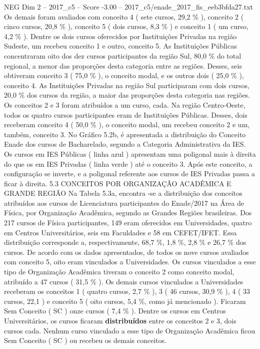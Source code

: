 \begin{textsample}{NEG Dim 2 – 2017\_c5 – Score -3.00 – 2017\_c5/enade\_2017\_fis\_eeb3bfda27.txt}
Os demais foram avaliados com conceito 4 ( sete cursos, 29,2 \% ), conceito 2 ( cinco cursos, 20,8 \% ), conceito 5 ( dois cursos, 8,3 \% ) e conceito 1 ( um curso, 4,2 \% ).
Dentre os dois cursos oferecidos por Instituições Privadas na região Sudeste, um recebeu conceito 1 e outro, conceito 5.
As Instituições Públicas concentraram oito dos dez cursos participantes da região Sul, 80,0 \% do total regional, a menor das proporções desta categoria entre as regiões.
Desses, seis obtiveram conceito 3 ( 75,0 \% ), o conceito modal, e os outros dois ( 25,0 \% ), conceito 4.
As Instituições Privadas na região Sul participaram com dois cursos, 20,0 \% dos cursos da região, a maior das proporções desta categoria nas regiões.
Os conceitos 2 e 3 foram atribuídos a um curso, cada.
Na região Centro-Oeste, todos os quatro cursos participantes eram de Instituições Públicas.
Desses, dois receberam conceito 4 ( 50,0 \% ), o conceito modal, um recebeu conceito 2 e um, também, conceito 3.
No Gráfico 5.2b, é apresentada a distribuição do Conceito Enade dos cursos de Bacharelado, segundo a Categoria Administrativa da IES.
Os cursos em IES Públicas ( linha azul ) apresentam uma poligonal mais à direita do que os em IES Privadas ( linha verde ) até o conceito 3.
Após este conceito, a configuração se inverte, e a poligonal referente aos cursos de IES Privadas passa a ficar à direita. 5.3 CONCEITOS POR ORGANIZAÇÃO ACADÊMICA E GRANDE REGIÃO Na Tabela 5.3a, encontra -se a distribuição dos conceitos atribuídos aos cursos de Licenciatura participantes do Enade/2017 na Área de Física, por Organização Acadêmica, segundo as Grandes Regiões brasileiras.
Dos 217 cursos de Física participantes, 149 eram oferecidos em Universidades, quatro em Centros Universitários, seis em Faculdades e 58 em CEFET/IFET.
Essa distribuição corresponde a, respectivamente, 68,7 \%, 1,8 \%, 2,8 \% e 26,7 \% dos cursos.
De acordo com os dados apresentados, de todos os nove cursos avaliados com conceito 5, oito eram vinculados a Universidades.
Os cursos vinculados a esse tipo de Organização Acadêmica tiveram o conceito 2 como conceito modal, atribuído a 47 cursos ( 31,5 \% ).
Os demais cursos vinculados a Universidades receberam os conceitos 1 ( quatro cursos, 2,7 \% ), 3 ( 46 cursos, 30,9 \% ), 4 ( 33 cursos, 22,1 ) e conceito 5 ( oito cursos, 5,4 \%, como já mencionado ).
Ficaram Sem Conceito ( SC ) onze cursos ( 7,4 \% ).
Dentre os cursos em Centros Universitários, os cursos ficaram \textbf{distribuídos} entre os conceitos 2 e 3, dois cursos cada.
Nenhum curso vinculado a esse tipo de Organização Acadêmica ficou Sem Conceito ( SC ) ou recebeu os demais conceitos.

\end{textsample}
